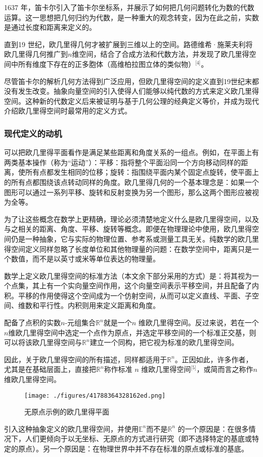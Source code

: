1637 年，笛卡尔引入了笛卡尔坐标系，并展示了如何把几何问题转化为数的代数运算。这一思想把几何归约为代数，是一种重大的观念转变，因为在此之前，实数是通过长度和距离来定义的。

直到19 世纪，欧几里得几何才被扩展到三维以上的空间。路德维希·施莱夫利将欧几里得几何推广到$n$维空间，结合了合成方法和代数方法，并发现了欧几里得空间中所有维度下存在的正多胞体（高维柏拉图立体的类似物）\(^\text{[4]}\)。

尽管笛卡尔的解析几何方法得到广泛应用，但欧几里得空间的定义直到19世纪末都没有发生改变。抽象向量空间的引入使得人们能够以纯代数的方式来定义欧几里得空间。这种新的代数定义后来被证明与基于几何公理的经典定义等价，并成为现代介绍欧几里得空间时最常用的定义方式。
\subsubsection{现代定义的动机}
可以把欧几里得平面看作是满足某些距离和角度关系的一组点。例如，在平面上有两类基本操作（称为“运动”）：平移：指将整个平面沿同一个方向移动同样的距离，使所有点都发生相同的位移；旋转：指围绕平面内某个固定点旋转，使平面上的所有点都围绕该点转动同样的角度。欧几里得几何的一个基本理念是：如果一个图形可以通过一系列平移、旋转和反射变换为另一个图形，那么这两个图形应被视为全等。

为了让这些概念在数学上更精确，理论必须清楚地定义什么是欧几里得空间，以及与之相关的距离、角度、平移、旋转等概念。即便在物理理论中使用，欧几里得空间仍是一种抽象，它与实际的物理位置、参考系或测量工具无关。纯数学的欧几里得空间定义同样忽略了长度单位和其他物理量的问题：在数学空间中，距离只是一个数值，而不是以英寸或米等单位表达的物理量。

数学上定义欧几里得空间的标准方法（本文余下部分采用的方式）是：将其视为一个点集，其上有一个实向量空间作用，这个向量空间表示平移空间，并且配备了内积。平移的作用使得这个空间成为一个仿射空间，从而可以定义直线、平面、子空间、维数和平行性。内积则用来定义距离和角度。

配备了点积的实数$n$-元组集合$\mathbb{R}^n$就是一个$n$ 维欧几里得空间。反过来说，若在一个$n$维欧几里得空间中选定一个点作为原点，并选定平移空间的一个标准正交基，则可以将该欧几里得空间与$\mathbb{R}^n$建立一个同构，把它视为标准的欧几里得空间。

因此，关于欧几里得空间的所有描述，同样都适用于$\mathbb{R}^n$。正因如此，许多作者，尤其是在基础层面上，直接把$\mathbb{R}^n$称作标准 $n$ 维欧几里得空间\(^\text{[5]}\)，或简而言之称作$n$ 维欧几里得空间。
\begin{figure}[ht]
\centering
\texttt{[image: ./figures/41788364328162ed.png]}
\caption{无原点示例的欧几里得平面} \label{fig_OJLDkj_2}
\end{figure}
引入这种抽象定义的欧几里得空间，并使用$\mathbb{E}^n$而不是$\mathbb{R}^n$ 的一个原因是：在很多情况下，人们更倾向于以无坐标、无原点的方式进行研究（即不选择特定的基底或特定的原点）。另一个原因是：在物理世界中并不存在标准的原点或标准的基底。
